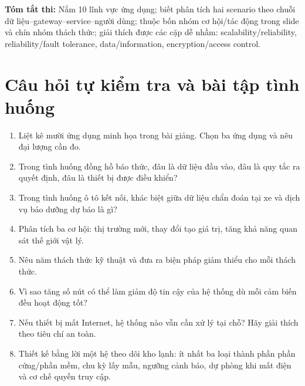 \begin{notebox}
\textbf{Tóm tắt thi:} Nắm 10 lĩnh vực ứng dụng; biết phân tích hai scenario theo chuỗi dữ liệu--gateway--service--người dùng; thuộc bốn nhóm cơ hội/tác động trong slide và chín nhóm thách thức; giải thích được các cặp dễ nhầm: scalability/reliability, reliability/fault tolerance, data/information, encryption/access control.
\end{notebox}
\section{Câu hỏi tự kiểm tra và bài tập tình huống}
\begin{enumerate}
\item Liệt kê mười ứng dụng minh họa trong bài giảng. Chọn ba ứng dụng và nêu đại lượng cần đo.
\item Trong tình huống đồng hồ báo thức, đâu là dữ liệu đầu vào, đâu là quy tắc ra quyết định, đâu là thiết bị được điều khiển?
\item Trong tình huống ô tô kết nối, khác biệt giữa dữ liệu chẩn đoán tại xe và dịch vụ bảo dưỡng dự báo là gì?
\item Phân tích ba cơ hội: thị trường mới, thay đổi tạo giá trị, tăng khả năng quan sát thế giới vật lý.
\item Nêu năm thách thức kỹ thuật và đưa ra biện pháp giảm thiểu cho mỗi thách thức.
\item Vì sao tăng số nút có thể làm giảm độ tin cậy của hệ thống dù mỗi cảm biến đều hoạt động tốt?
\item Nếu thiết bị mất Internet, hệ thống nào vẫn cần xử lý tại chỗ? Hãy giải thích theo tiêu chí an toàn.
\item Thiết kế bằng lời một hệ theo dõi kho lạnh: ít nhất ba loại thành phần phần cứng/phần mềm, chu kỳ lấy mẫu, ngưỡng cảnh báo, dự phòng khi mất điện và cơ chế quyền truy cập.
\end{enumerate}